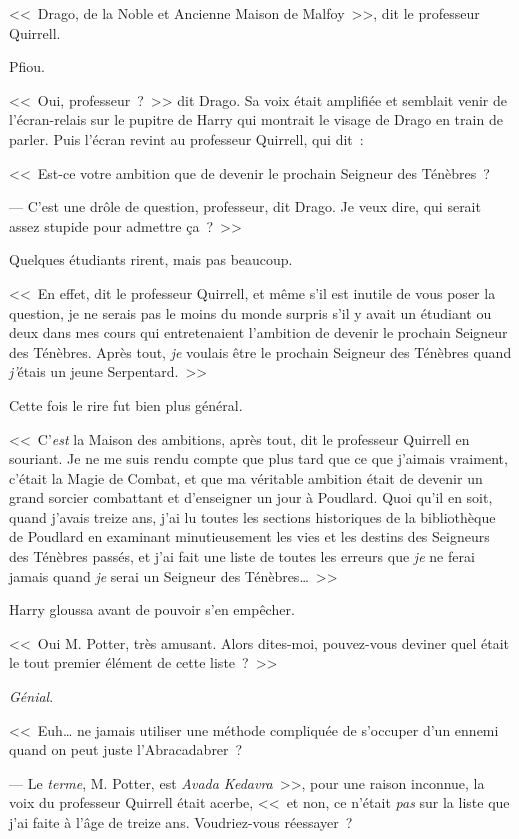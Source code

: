 <<~Drago, de la Noble et Ancienne Maison de Malfoy~>>, dit le professeur Quirrell.

Pfiou.

<<~Oui, professeur~?~>> dit Drago. Sa voix était amplifiée et semblait venir de l'écran-relais sur le pupitre de Harry qui montrait le visage de Drago en train de parler. Puis l'écran revint au professeur Quirrell, qui dit~:

<<~Est-ce votre ambition que de devenir le prochain Seigneur des Ténèbres~?

--- C'est une drôle de question, professeur, dit Drago. Je veux dire, qui serait assez stupide pour admettre ça~?~>>

Quelques étudiants rirent, mais pas beaucoup.

<<~En effet, dit le professeur Quirrell, et même s'il est inutile de vous poser la question, je ne serais pas le moins du monde surpris s'il y avait un étudiant ou deux dans mes cours qui entretenaient l'ambition de devenir le prochain Seigneur des Ténèbres. Après tout, \emph{je} voulais être le prochain Seigneur des Ténèbres quand \emph{j'}étais un jeune Serpentard.~>>

Cette fois le rire fut bien plus général.

<<~C'\emph{est} la Maison des ambitions, après tout, dit le professeur Quirrell en souriant. Je ne me suis rendu compte que plus tard que ce que j'aimais vraiment, c'était la Magie de Combat, et que ma véritable ambition était de devenir un grand sorcier combattant et d'enseigner un jour à Poudlard. Quoi qu'il en soit, quand j'avais treize ans, j'ai lu toutes les sections historiques de la bibliothèque de Poudlard en examinant minutieusement les vies et les destins des Seigneurs des Ténèbres passés, et j'ai fait une liste de toutes les erreurs que \emph{je} ne ferai jamais quand \emph{je} serai un Seigneur des Ténèbres…~>>

Harry gloussa avant de pouvoir s'en empêcher.

<<~Oui M. Potter, très amusant. Alors dites-moi, pouvez-vous deviner quel était le tout premier élément de cette liste~?~>>

\emph{Génial}.

<<~Euh… ne jamais utiliser une méthode compliquée de s'occuper d'un ennemi quand on peut juste l'Abracadabrer~?

--- Le \emph{terme}, M. Potter, est \emph{Avada Kedavra}~>>, pour une raison inconnue, la voix du professeur Quirrell était acerbe, <<~et non, ce n'était \emph{pas} sur la liste que j'ai faite à l'âge de treize ans. Voudriez-vous réessayer~?

